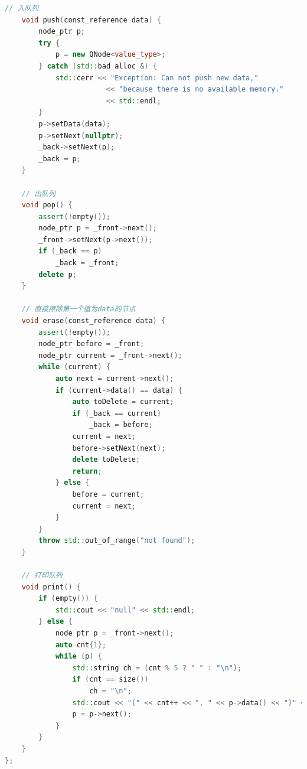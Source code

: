 \documentclass{ctexart}
\begin{document}
\begin{lstlisting}[language=C++,caption=Queue<T>类模板的实现,label=code5]
    // 入队列
    void push(const_reference data) {
        node_ptr p;
        try {
            p = new QNode<value_type>;
        } catch (std::bad_alloc &) {
            std::cerr << "Exception: Can not push new data,"
                        << "because there is no available memory."
                        << std::endl;
        }
        p->setData(data);
        p->setNext(nullptr);
        _back->setNext(p);
        _back = p;
    }

    // 出队列
    void pop() {
        assert(!empty());
        node_ptr p = _front->next();
        _front->setNext(p->next());
        if (_back == p)
            _back = _front;
        delete p;
    }

    // 直接擦除第一个值为data的节点
    void erase(const_reference data) {
        assert(!empty());
        node_ptr before = _front;
        node_ptr current = _front->next();
        while (current) {
            auto next = current->next();
            if (current->data() == data) {
                auto toDelete = current;
                if (_back == current)
                    _back = before;
                current = next;
                before->setNext(next);
                delete toDelete;
                return;
            } else {
                before = current;
                current = next;
            }
        }
        throw std::out_of_range("not found");
    }

    // 打印队列
    void print() {
        if (empty()) {
            std::cout << "null" << std::endl;
        } else {
            node_ptr p = _front->next();
            auto cnt{1};
            while (p) {
                std::string ch = (cnt % 5 ? " " : "\n");
                if (cnt == size())
                    ch = "\n";
                std::cout << "(" << cnt++ << ", " << p->data() << ")" << ch;
                p = p->next();
            }
        }
    }
};
\end{lstlisting}
\end{document}
